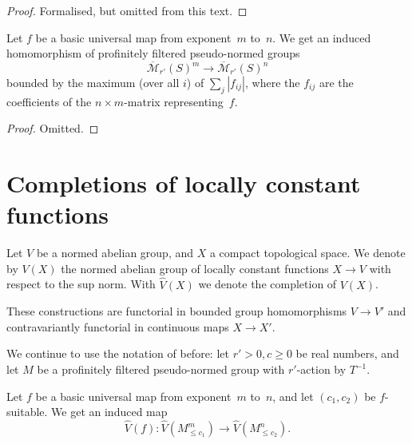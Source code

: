 \begin{proof}
  \leanok
  Formalised, but omitted from this text.
\end{proof}

\begin{lemma}
  \label{basic_eval_FP}
  \leanok
  Let $f$ be a basic universal map from exponent~$m$ to~$n$.
  We get an induced homomorphism of
  profinitely filtered pseudo-normed groups
  \[
    \overline{\mathcal M}_{r'}(S)^m \to \overline{\mathcal M}_{r'}(S)^n
  \]
  bounded by the maximum (over all $i$) of $\sum_j |f_{ij}|$,
  where the $f_{ij}$ are the coefficients of the $n \times m$-matrix representing~$f$.
\end{lemma}

\begin{proof}
  \leanok
  Omitted.
\end{proof}

\section{Completions of locally constant functions}

\begin{definition}
  \label{Vhat}
  \leanok
  Let $V$ be a normed abelian group, and $X$ a compact topological space.
  We denote by $V(X)$ the normed abelian group of locally constant functions $X \to V$
  with respect to the sup norm.
  With $\hat V(X)$ we denote the completion of $V(X)$.

  These constructions are functorial in bounded group homomorphisms $V \to V'$
  and contravariantly functorial in continuous maps $X \to X'$.
\end{definition}

We continue to use the notation of before:
let $r' > 0, c \ge 0$ be real numbers,
and let $M$ be a profinitely filtered pseudo-normed group with $r'$-action by $T^{-1}$.

\begin{definition}
  \label{basic_eval_CLCFP}
  \leanok
  Let $f$ be a basic universal map from exponent~$m$ to~$n$,
  and let $(c_1, c_2)$ be $f$-suitable.
  We get an induced map
  \[
    \hat V(f) \colon \hat V(M_{\le c_1}^m) \to \hat V(M_{\le c_2}^n).
  \]
\end{definition}

